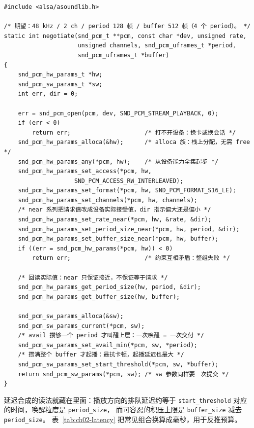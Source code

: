\documentclass[12pt,a4paper,fontset=fandol]{ctexbook}
\newcommand{\Tp}[1]{\texttt{#1}}
\begin{document}
\begin{lstlisting}[style=cstyle,
  caption={ALSA 参数协商：hw\_params 定形状，sw\_params 定节拍与唤醒时机},
  label={lst:ch02-hwparams}]
#include <alsa/asoundlib.h>

/* 期望：48 kHz / 2 ch / period 128 帧 / buffer 512 帧（4 个 period）。 */
static int negotiate(snd_pcm_t **pcm, const char *dev, unsigned rate,
                     unsigned channels, snd_pcm_uframes_t *period,
                     snd_pcm_uframes_t *buffer)
{
    snd_pcm_hw_params_t *hw;
    snd_pcm_sw_params_t *sw;
    int err, dir = 0;

    err = snd_pcm_open(pcm, dev, SND_PCM_STREAM_PLAYBACK, 0);
    if (err < 0)
        return err;                     /* 打不开设备：换卡或换会话 */
    snd_pcm_hw_params_alloca(&hw);      /* alloca 族：栈上分配，无需 free */
    snd_pcm_hw_params_any(*pcm, hw);    /* 从设备能力全集起步 */
    snd_pcm_hw_params_set_access(*pcm, hw,
                    SND_PCM_ACCESS_RW_INTERLEAVED);
    snd_pcm_hw_params_set_format(*pcm, hw, SND_PCM_FORMAT_S16_LE);
    snd_pcm_hw_params_set_channels(*pcm, hw, channels);
    /* near 系列把请求值改成设备实际接受值，dir 指示偏大还是偏小 */
    snd_pcm_hw_params_set_rate_near(*pcm, hw, &rate, &dir);
    snd_pcm_hw_params_set_period_size_near(*pcm, hw, period, &dir);
    snd_pcm_hw_params_set_buffer_size_near(*pcm, hw, buffer);
    if ((err = snd_pcm_hw_params(*pcm, hw)) < 0)
        return err;                     /* 约束互相矛盾：整组失败 */

    /* 回读实际值：near 只保证接近，不保证等于请求 */
    snd_pcm_hw_params_get_period_size(hw, period, &dir);
    snd_pcm_hw_params_get_buffer_size(hw, buffer);

    snd_pcm_sw_params_alloca(&sw);
    snd_pcm_sw_params_current(*pcm, sw);
    /* avail 攒够一个 period 才叫醒上层：一次唤醒 = 一次交付 */
    snd_pcm_sw_params_set_avail_min(*pcm, sw, *period);
    /* 攒满整个 buffer 才起播：最抗卡顿，起播延迟也最大 */
    snd_pcm_sw_params_set_start_threshold(*pcm, sw, *buffer);
    return snd_pcm_sw_params(*pcm, sw); /* sw 参数同样要一次提交 */
}
\end{lstlisting}

延迟合成的读法就藏在里面：播放方向的排队延迟约等于
\Tp{start\_threshold} 对应的时间，唤醒粒度是 \Tp{period\_size}，
而可容忍的积压上限是 \Tp{buffer\_size} 减去 \Tp{period\_size}。
表~\ref{tab:ch02-latency} 把常见组合换算成毫秒，用于反推预算。
\end{document}
